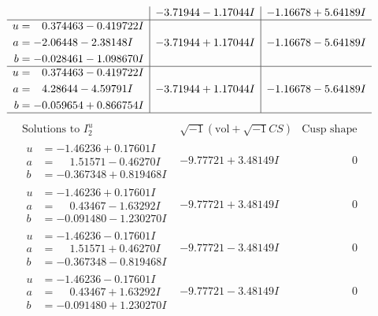 \documentclass[1p]{elsarticle_modified}
\theoremstyle{definition}
\newcommand{\I}{\sqrt{-1}}
\begin{document}
$$\begin{array}{c|c|c}
 & -3.71944 - 1.17044 I & -1.16678 + 5.64189 I \\ \hline\begin{aligned}
u &= \phantom{-}0.374463 - 0.419722 I \\
a &= -2.06448 - 2.38148 I \\
b &= -0.028461 - 1.098670 I\end{aligned}
 & -3.71944 + 1.17044 I & -1.16678 - 5.64189 I \\ \hline\begin{aligned}
u &= \phantom{-}0.374463 - 0.419722 I \\
a &= \phantom{-}4.28644 - 4.59791 I \\
b &= -0.059654 + 0.866754 I\end{aligned}
 & -3.71944 + 1.17044 I & -1.16678 - 5.64189 I\\
 \hline 
 \end{array}$$\newpage$$\begin{array}{c|c|c}  
\text{Solutions to }I^u_{2}& \I (\text{vol} + \sqrt{-1}CS) & \text{Cusp shape}\\
 \hline 
\begin{aligned}
u &= -1.46236 + 0.17601 I \\
a &= \phantom{-}1.51571 - 0.46270 I \\
b &= -0.367348 + 0.819468 I\end{aligned}
 & -9.77721 + 3.48149 I & \phantom{-0.000000 } 0 \\ \hline\begin{aligned}
u &= -1.46236 + 0.17601 I \\
a &= \phantom{-}0.43467 - 1.63292 I \\
b &= -0.091480 - 1.230270 I\end{aligned}
 & -9.77721 + 3.48149 I & \phantom{-0.000000 } 0 \\ \hline\begin{aligned}
u &= -1.46236 - 0.17601 I \\
a &= \phantom{-}1.51571 + 0.46270 I \\
b &= -0.367348 - 0.819468 I\end{aligned}
 & -9.77721 - 3.48149 I & \phantom{-0.000000 } 0 \\ \hline\begin{aligned}
u &= -1.46236 - 0.17601 I \\
a &= \phantom{-}0.43467 + 1.63292 I \\
b &= -0.091480 + 1.230270 I\end{aligned}
 & -9.77721 - 3.48149 I & \phantom{-0.000000 } 0 \\ \hline\begin{aligned}

\end{aligned}
\end{array}$$
\end{document}
